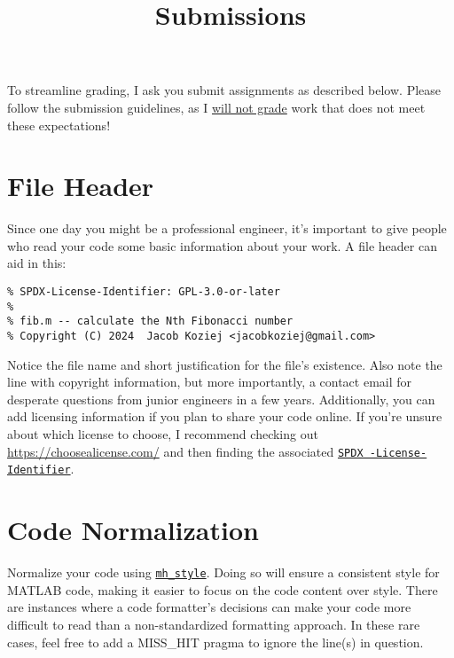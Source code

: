 \documentclass{article}
\title{Submissions}
\begin{document}
\renderTitle

\noindent
To streamline grading, I ask you submit assignments as described below.
Please follow the submission guidelines, as I \underline{will not grade}
work that does not meet these expectations!

\section{File Header}

Since one day you might be a professional engineer, it's important to
give people who read your code some basic information about your work. A
file header can aid in this:

\begin{verbatim}
% SPDX-License-Identifier: GPL-3.0-or-later
%
% fib.m -- calculate the Nth Fibonacci number
% Copyright (C) 2024  Jacob Koziej <jacobkoziej@gmail.com>
\end{verbatim}

\noindent
Notice the file name and short justification for the file's existence.
Also note the line with copyright information, but more importantly, a
contact email for desperate questions from junior engineers in a few
years.  Additionally, you can add licensing information if you plan to
share your code online.  If you're unsure about which license to choose,
I recommend checking out \url{https://choosealicense.com/} and then
finding the associated \href{https://spdx.org/licenses/}{\texttt{SPDX%
-License-Identifier}}.

\section{Code Normalization}

Normalize your code using \href{https://florianschanda.github.io/%
miss_hit/style_checker.html}{\texttt{mh\_style}}.  Doing so will ensure
a consistent style for MATLAB code, making it easier to focus on the
code content over style.  There are instances where a code formatter's
decisions can make your code more difficult to read than a
non-standardized formatting approach.  In these rare cases, feel free to
add a MISS\_HIT pragma to ignore the line(s) in question.
\end{document}
